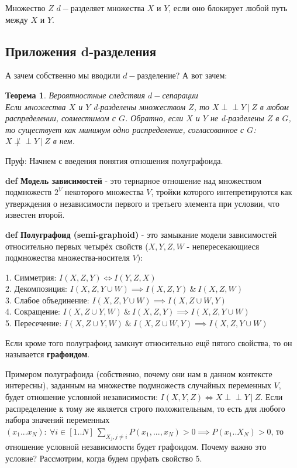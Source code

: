 \documentclass[fleqn]{article}
\newcommand{\independent}{\perp \!\!\! \perp}
\def\define#1{\textbf{def} \textbf{#1}}
\newtheorem{theorem}{Теорема}
\begin{document}
Множество $Z$ $d-$разделяет множества $X$ и $Y$, если оно блокирует любой путь между $X$ и $Y$.

\subsection*{Приложения d-разделения}

А зачем собственно мы вводили $d-$разделение? А вот зачем:

\begin{theorem} Вероятностные следствия $d-$сепарации\\
Если множества $X$ и $Y$  d-разделены множеством $Z$, то $X \independent Y\ |\ Z$ в любом распределении, совместимом с $G$. Обратно, если $X$ и $Y$ не d-разделены $Z$ в $G$, то существует как минимум одно распределение, согласованное с $G$: $X \not \independent Y \ | \ Z$ в нем.
\label{th:th1}
\end{theorem}

Пруф: Начнем с введения понятия отношения полуграфоида.

\vspace{0.2cm}

\define{Модель зависимостей} - это тернарное отношение над множеством подмножеств $2^V$ некоторого множества $V$, тройки которого интепретируются как утверждения о независимости первого и третьего элемента при условии, что известен второй.

\define{Полуграфоид (semi-graphoid)} - это замыкание модели зависимостей относительно первых четырёх свойств ($X, Y, Z, W$ - непересекающиеся подмножества множества-носителя $V$):
\begin{tcolorbox}
1. Симметрия: $I(X, Z, Y) \iff I(Y, Z, X)$ \\
2. Декомпозиция: $I(X, Z, Y\cup W) \implies I(X, Z, Y)\ \&\ I(X, Z, W)$\\
3. Слабое объединение: $I(X, Z, Y\cup W) \implies I(X, Z \cup W, Y)$\\
4. Сокращение: $I(X, Z\cup Y, W)\ \&\ I(X, Z, Y) \implies I(X, Z, Y\cup W)$\\
5. Пересечение: $I(X, Z\cup Y, W)\ \&\ I(X, Z\cup W, Y) \implies I(X, Z, Y\cup W)$
\end{tcolorbox}

Если кроме того полуграфоид замкнут относительно ещё пятого свойства, то он называется \textbf{графоидом}.


Примером полуграфоида (собственно, почему они нам в данном контексте интересны), заданным на множестве подмножеств случайных переменных $V$, будет отношение условной независимости: $I(X,Y,Z) \iff X \independent Y\ |\ Z$. Если распределение к тому же является строго положительным, то есть для любого набора значений переменных $(x_1...x_N):\ \forall i \in [1..N]\ \sum\limits_{X_j, j\neq i}P(x_1, ..., x_N) > 0 \implies P(x_1..X_N) > 0$, то отношение условной независимости будет графоидом. Почему важно это условие? Рассмотрим, когда будем пруфать свойство 5.
\end{document}
